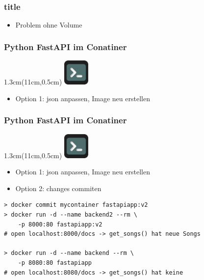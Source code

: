 \documentclass[22pt]{beamer}
\newcommand{\terminal}{
    \begin{textblock*}{1.3cm}(11cm,0.5cm) %
    \includegraphics[width=1.3cm]{Bilder/terminal2.png}
    \end{textblock*}
}
\begin{document}
\begin{frame}[t]
    \frametitle{title}
    \begin{itemize}
        \item Problem ohne Volume
    \end{itemize}
\end{frame}

\begin{frame}[fragile]
    \frametitle{Python FastAPI im Conatiner}
    \terminal
    \begin{itemize}
        \item Option 1: json anpassen, Image neu erstellen
    \end{itemize}

\end{frame}

\begin{frame}[fragile]
    \frametitle{Python FastAPI im Conatiner}
    \terminal
    \begin{itemize}
        \item Option 1: json anpassen, Image neu erstellen
        \item Option 2: changes commiten
    \end{itemize}

\begin{verbatim}
> docker commit mycontainer fastapiapp:v2
> docker run -d --name backend2 --rm \
    -p 8000:80 fastapiapp:v2
# open localhost:8000/docs -> get_songs() hat neue Songs

> docker run -d --name backend --rm \
    -p 8080:80 fastapiapp
# open localhost:8080/docs -> get_songs() hat keine
\end{verbatim}
\end{frame}
\end{document}
